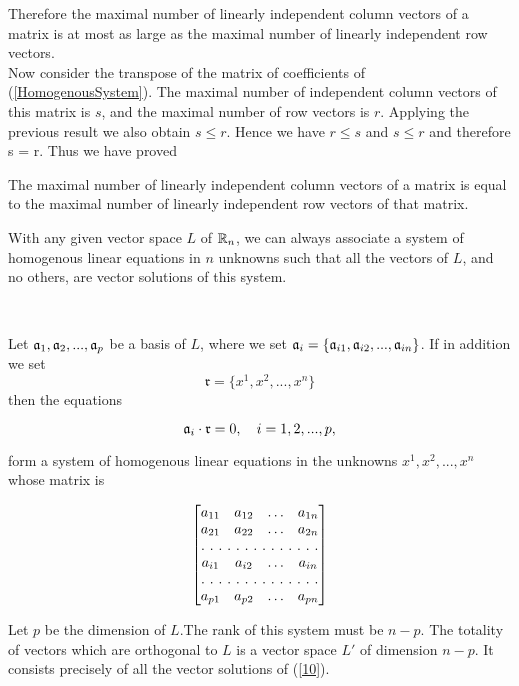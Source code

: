 Therefore the maximal number of linearly independent column vectors of a matrix is at most as large as the maximal number of linearly independent row vectors. \\

Now consider the transpose of the matrix of coefficients of (\ref{HomogenousSystem}). The maximal number of independent column vectors of this matrix is $s$, and the maximal number of row vectors is $r$.
Applying the previous result we also obtain $s\le r$. Hence we have $r \le s$ and $s\le r$ and therefore s = r. Thus we have proved

\begin{theorem}
The maximal number of linearly independent column vectors of a matrix is equal to the maximal number of linearly independent row vectors of that matrix. 
\end{theorem}

\begin{theorem}
With any given vector space $L$ of $\mathbb{R}_n$, we can always associate a system of homogenous linear equations in $n$ unknowns such that all the vectors of $L$, and no others, are vector solutions of this system.
\end{theorem}\

Let $\mathfrak{a}_1, \mathfrak{a}_2, ..., \mathfrak{a}_p$ be a basis of $L$, where we set $\mathfrak{a}_i = \{\mathfrak{a}_{i1}, \mathfrak{a}_{i2}, ..., \mathfrak{a}_{in}\}$. If in addition we set 
$$\mathfrak{r} = \{ x^1, x^2, ..., x^n\}$$ then the equations 

\begin{equation}\mathfrak{a}_i \cdot \mathfrak{r} = 0, \quad i = 1, 2, ..., p,\label{10}\end{equation}

form a system of homogenous linear equations in the unknowns $x^1, x^2, ..., x^n$ whose matrix is

\[
\begin{bmatrix}
a_{11} & a_{12}  & \hdots & a_{1n} \\
a_{21} & a_{22}  & \hdots & a_{2n} \\
\hdotsfor[2]{4}\\
a_{i1} & a_{i2}  & \hdots & a_{in}  \\
\hdotsfor[2]{4}\\
a_{p1} & a_{p2}  & \hdots & a_{pn}\\
\end{bmatrix}
\]

Let $p$ be the dimension of $L$.The rank of this system must be $n-p$. The totality of vectors which are orthogonal to $L$ is a vector space $L'$ of dimension $n-p$. It consists precisely of all the vector solutions of (\ref{10}).\\

